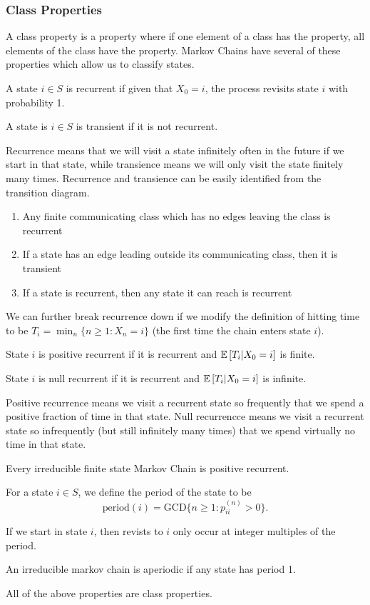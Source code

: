 \subsubsection{Class Properties}
A class property is a property where if one element of a class has the property, all elements of the class have the property.
Markov Chains have several of these properties which allow us to classify states.
\begin{definition}
	A state $i\in S$ is recurrent if given that $X_0=i$, the process revisits state $i$ with probability 1.
	\label{defn:markov-recurrence}
\end{definition}
\begin{definition}
	A state is $i\in S$ is transient if it is not recurrent.
	\label{defn:markov-transience}
\end{definition}
Recurrence means that we will visit a state infinitely often in the future if we start in that state, while transience means we will only visit the state finitely many times.
Recurrence and transience can be easily identified from the transition diagram.
\begin{enumerate}
	\item Any finite communicating class which has no edges leaving the class is recurrent
	\item If a state has an edge leading outside its communicating class, then it is transient
	\item If a state is recurrent, then any state it can reach is recurrent
\end{enumerate}
We can further break recurrence down if we modify the definition of hitting time to be $T_i = \min_n \{ n \geq 1 : X_n=i \}$ (the first time the chain enters state $i$).
\begin{definition}
	State $i$ is positive recurrent if it is recurrent and $\mathbb{E}\left[T_i|X_0=i\right]$ is finite.
	\label{defn:positive-recurrence}
\end{definition}
\begin{definition}
	State $i$ is null recurrent if it is recurrent and $\mathbb{E}\left[T_i|X_0=i\right]$ is infinite.
	\label{defn:null-recurrence}
\end{definition}
Positive recurrence means we visit a recurrent state so frequently that we spend a positive fraction of time in that state.
Null recurrencce means we visit a recurrent state so infrequently (but still infinitely many times) that we spend virtually no time in that state.
\begin{theorem}
	Every irreducible finite state Markov Chain is positive recurrent.
	\label{thm:positive-recurrence}
\end{theorem}
\begin{definition}
	For a state $i\in S$, we define the period of the state to be
	\[
		\text{period}(i) = \text{GCD}\{n\geq 1 : p_{ii}^{(n)} > 0 \}.
	\]
	\label{defn:period}
\end{definition}
If we start in state $i$, then revists to $i$ only occur at integer multiples of the period.
\begin{definition}
	An irreducible markov chain is aperiodic if any state has period 1.
	\label{defn:aperiodic-mc}
\end{definition}
All of the above properties are class properties.
